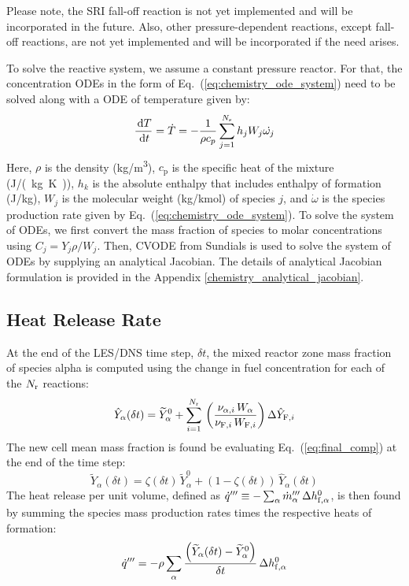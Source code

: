 Please note, the SRI fall-off reaction is not yet implemented and will be incorporated in the future. Also, other pressure-dependent reactions, except fall-off reactions, are not yet implemented and will be incorporated if the need arises.

To solve the reactive system, we assume a constant pressure reactor. For that, the concentration ODEs in the form of Eq.~(\ref{eq:chemistry_ode_system}) need to be solved along with a ODE of temperature given by:
\begin{equation}\label{eq:TemperatureDerivative}
\frac{\,\mathrm{d} T}{\,\mathrm{d} t} = \dot{T} = -\frac{1}{\rho c_p} \sum_{j=1}^{N_{\mathrm{s}}}h_j W_j \dot{\omega_j}
\end{equation} 
Here,  $\rho$  is the density (\unit{kg/m^3}), $c_{\mathrm{p}}$ is the specific heat of the mixture (\unit{J/(kg.K)}), $h_k$ is the absolute enthalpy that includes enthalpy of formation (J/kg), $W_j$ is the molecular weight (kg/kmol) of species $j$, and $\dot{\omega}$ is the species production rate given by Eq.~(\ref{eq:chemistry_ode_system}).
To solve the system of ODEs, we first convert the mass fraction of species to molar concentrations using $C_j=Y_j\rho/W_j$. Then, CVODE from Sundials \cite{cvodeDoc:2024} is used to solve the system of ODEs by supplying an analytical Jacobian. The details of analytical Jacobian formulation is provided in the Appendix \ref{chemistry_analytical_jacobian}.


\subsection{Heat Release Rate}
\label{sec:hrr}

At the end of the LES/DNS time step, $\delta t$, the mixed reactor zone mass fraction of species alpha is computed using the change in fuel concentration for each of the $N_{\rm r}$ reactions:
\begin{equation}\label{eq:change_alpha}
\hat{Y}_\alpha(\delta t) = \widetilde{Y}_\alpha^0 + \sum_{i=1}^{N_{\rm r}} \,\left(\frac{\nu_{\alpha,i} \,W_{\alpha}}{\nu_{{\rm F},i} \,W_{{\rm F},i}}\right)\Delta \hat{Y}_{{\rm F},i}
\end{equation}
The new cell mean mass fraction is found be evaluating Eq.~(\ref{eq:final_comp}) at the end of the time step:
\begin{equation}
\label{eq:final_comp2}
\widetilde{Y}_{\alpha}(\delta t)= \zeta(\delta t) \, \widetilde{Y}_{\alpha}^0 + (1-\zeta(\delta t)) \, \hat{Y}_{\alpha}(\delta t)
\end{equation}
The heat release per unit volume, defined as $\dot{q}''' \equiv - \sum_\alpha \dot{m}_\alpha''' \, \Delta h_{{\rm f},\alpha}^0$, is then found by summing the species mass production rates times the respective heats of formation:
\begin{equation}\label{eq:vol_heat_gen}
\dot{q}''' = - \rho  \sum_{\alpha} \frac{ \left( \widetilde{Y}_{\alpha}(\delta t)-\widetilde{Y}_{\alpha}^0 \right) }{\delta t} \, \Delta h_{{\rm f},\alpha}^0
\end{equation}




